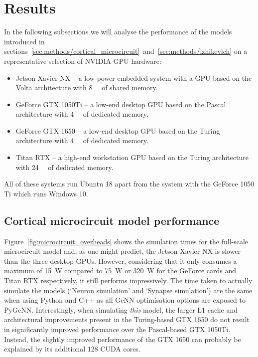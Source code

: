 \documentclass[utf8]{frontiersSCNS} %
\begin{document}
\section{Results}
In the following subsections we will analyse the performance of the models introduced in sections~\ref{sec:methods/cortical_microcircuit}~and~\ref{sec:methods/izhikevich} on a representative selection of NVIDIA GPU hardware:
%
\begin{itemize}
    \item Jetson Xavier NX -- a low-power embedded system with a GPU based on the Volta architecture with \SI{8}{\giga\byte} of shared memory.
    \item GeForce GTX 1050Ti -- a low-end desktop GPU based on the Pascal architecture with \SI{4}{\giga\byte} of dedicated memory.
    \item GeForce GTX 1650 -- a low-end desktop GPU based on the Turing architecture with \SI{4}{\giga\byte} of dedicated memory.
    \item Titan RTX -- a high-end workstation GPU based on the Turing architecture with \SI{24}{\giga\byte} of dedicated memory.
\end{itemize}
%
All of these systems run Ubuntu 18 apart from the system with the GeForce 1050 Ti which runs Windows 10.

\subsection{Cortical microcircuit model performance}
Figure~\ref{fig:microcircuit_overheads} shows the simulation times for the full-scale microcircuit model and, as one might predict, the Jetson Xavier NX is slower than the three desktop GPUs.
However, considering that it only consumes a maximum of \SI{15}{\watt} compared to \SI{75}{\watt} or \SI{320}{\watt} for the GeForce cards and Titan RTX respectively, it still performs impressively.
The time taken to actually simulate the models (`Neuron simulation' and `Synapse simulation') are the same when using Python and C++ as all GeNN optimisation options are exposed to PyGeNN.
Interestingly, when simulating \emph{this} model, the larger L1 cache and architectural improvements present in the Turing-based GTX 1650 do not result in significantly improved performance over the Pascal-based GTX 1050Ti.
Instead, the slightly improved performance of the GTX 1650 can probably be explained by its additional \num{128} CUDA cores.
\end{document}

